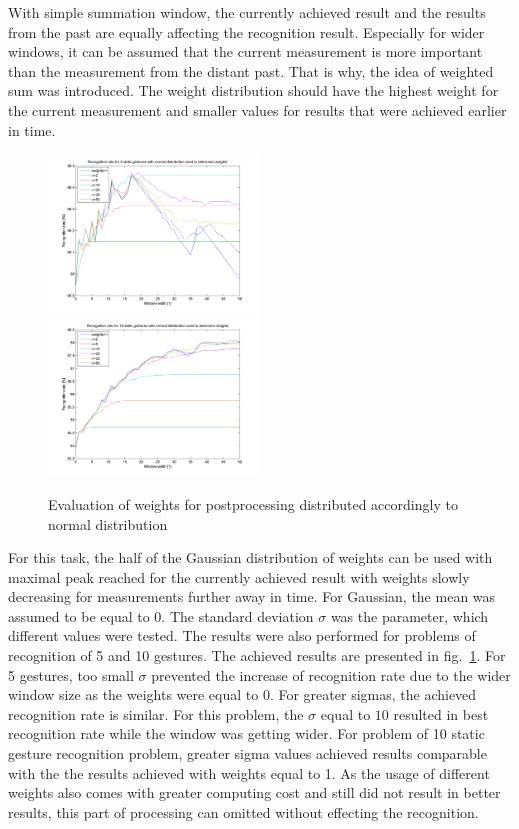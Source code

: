With simple summation window, the currently achieved result and the results from the past are equally affecting the recognition result. 
Especially for wider windows, it can be assumed that the current measurement is more important than the measurement from the distant past.
That is why, the idea of weighted sum was introduced.
The weight distribution should have the highest weight for the current measurement and smaller values for results that were achieved earlier in time.

\begin{figure}[htb]
\centering

\centerline{%
 \includegraphics[width=0.5\textwidth]{figures/gaussSum5.png}
 \includegraphics[width=0.5\textwidth]{figures/gaussSum10.png}
 }%
 \caption{Evaluation of weights for postprocessing distributed accordingly to normal distribution}
 \label{staticgauss}
\end{figure}

For this task, the half of the Gaussian distribution of weights can be used with maximal peak reached for the currently achieved result with weights slowly decreasing for measurements further away in time.
For Gaussian, the mean was assumed to be equal to $0$.
The standard deviation $\sigma$ was the parameter, which different values were tested.
The results were also performed for problems of recognition of 5 and 10 gestures.
The achieved results are presented in fig.~\ref{staticgauss}.
For 5 gestures, too small $\sigma$ prevented the increase of recognition rate due to the wider window size as the weights were equal to $0$. 
For greater sigmas, the achieved recognition rate is similar.
For this problem, the $\sigma$ equal to $10$ resulted in best recognition rate while the window was getting wider.
For problem of 10 static gesture recognition problem, greater sigma values achieved results comparable with the the results achieved with weights equal to 1.
As the usage of different weights also comes with greater computing cost and still did not result in better results, this part of processing can omitted without effecting the recognition.


